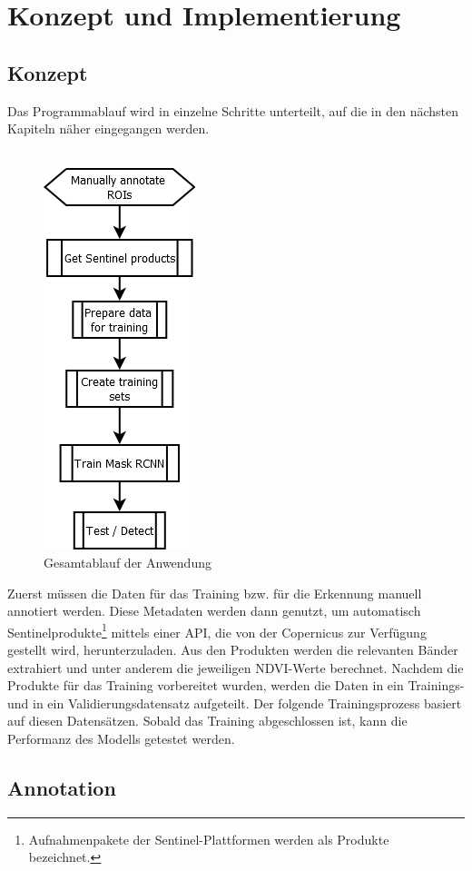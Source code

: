 \chapter{Konzept und Implementierung}\label{chap:concept}

\section{Konzept}\label{sec:concept}

Das Programmablauf wird in einzelne Schritte unterteilt, auf die in den nächsten Kapiteln näher eingegangen werden.
\\\\
\begin{figure}[ht]
  \centering
  \includegraphics[width=.2\textwidth]{pics/overview.PNG}
  \caption{Gesamtablauf der Anwendung}
  \label{fig:overview}
\end{figure}
Zuerst müssen die Daten für das Training bzw. für die Erkennung manuell annotiert werden. Diese Metadaten werden dann genutzt, um automatisch Sentinelprodukte\footnote{Aufnahmenpakete der Sentinel-Plattformen werden als Produkte bezeichnet.} mittels einer API, die von der Copernicus zur Verfügung gestellt wird, herunterzuladen. Aus den Produkten werden die relevanten Bänder extrahiert und unter anderem die jeweiligen NDVI-Werte berechnet. Nachdem die Produkte für das Training vorbereitet wurden, werden die Daten in ein Trainings- und in ein Validierungsdatensatz aufgeteilt. Der folgende Trainingsprozess basiert auf diesen Datensätzen. Sobald das Training abgeschlossen ist, kann die Performanz des Modells getestet werden. 

\section{Annotation}\label{sec:annotation}

